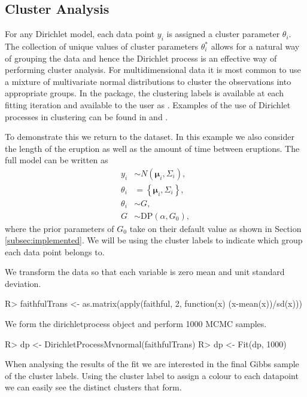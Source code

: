 \documentclass[nojss]{jss}
\begin{document}
\subsection{Cluster Analysis} \label{subsec:clusteranalysis}
For any Dirichlet model, each data point $y_i$ is assigned a cluster parameter $\theta _i$. The collection of unique values of cluster parameters $\theta _i ^*$ allows for a natural way of grouping the data and hence the Dirichlet process is an effective way of performing cluster analysis. For multidimensional data it is most common to use a mixture of multivariate normal distributions to cluster the observations into appropriate groups. In the  package, the clustering labels is available at each fitting iteration and available to the user as . Examples of the use of Dirichlet processes in clustering can be found in \cite{teh_sharing_2005} and \cite{kim_variable_2006}.

To demonstrate this we return to the  dataset. In this example we also consider the length of the eruption as well as the amount of time between eruptions. The full model can be written as
\begin{align*}
y _i & \sim N (\boldsymbol{\mu}_i, \Sigma _i ), \\
\theta_i & =  \left\lbrace \boldsymbol{\mu}_i, \Sigma _i \right\rbrace , \\
\theta _i & \sim G, \\
G & \sim \text{DP} ( \alpha, G_0 ),
\end{align*}
where the prior parameters of $G_0$ take on their default value as shown in Section \ref{subsec:implemented}. We will be using the cluster labels to indicate which group each data point belongs to.

We transform the data so that each variable is zero mean and unit standard deviation.
\begin{Schunk}
\begin{Sinput}
R> faithfulTrans <- as.matrix(apply(faithful, 2, function(x) (x-mean(x))/sd(x)))
\end{Sinput}
\end{Schunk}
We form the dirichletprocess object and perform 1000 MCMC samples.
\begin{Schunk}
\begin{Sinput}
R> dp <-  DirichletProcessMvnormal(faithfulTrans)
R> dp <- Fit(dp, 1000)
\end{Sinput}
\end{Schunk}
When analysing the results of the fit we are interested in the final Gibbs sample of the cluster labels. Using the cluster label to assign a colour to each datapoint we can easily see the distinct clusters that form.
\end{document}
